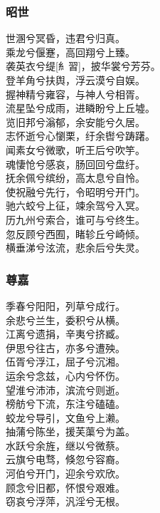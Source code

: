 \documentclass[]{article}
\begin{document}
\hypertarget{header-n287}{%
\subsubsection{昭世}\label{header-n287}}

世溷兮冥昏，违君兮归真。\\
乘龙兮偃蹇，高回翔兮上臻。\\
袭英衣兮缇{[}糹習{]}，披华裳兮芳芬。\\
登羊角兮扶舆，浮云漠兮自娱。\\
握神精兮雍容，与神人兮相胥。\\
流星坠兮成雨，进瞵盼兮上丘墟。\\
览旧邦兮滃郁，余安能兮久居。\\
志怀逝兮心懰栗，纡余辔兮踌躇。\\
闻素女兮微歌，听王后兮吹竽。\\
魂悽怆兮感哀，肠回回兮盘纡。\\
抚余佩兮缤纷，高太息兮自怜。\\
使祝融兮先行，令昭明兮开门。\\
驰六蛟兮上征，竦余驾兮入冥。\\
历九州兮索合，谁可与兮终生。\\
忽反顾兮西囿，睹轸丘兮崎倾。\\
横垂涕兮泫流，悲余后兮失灵。

\hypertarget{header-n292}{%
\subsubsection{尊嘉}\label{header-n292}}

季春兮阳阳，列草兮成行。\\
余悲兮兰生，委积兮从横。\\
江离兮遗捐，辛夷兮挤臧。\\
伊思兮往古，亦多兮遭殃。\\
伍胥兮浮江，屈子兮沉湘。\\
运余兮念兹，心内兮怀伤。\\
望淮兮沛沛，滨流兮则逝。\\
榜舫兮下流，东注兮磕磕。\\
蛟龙兮导引，文鱼兮上濑。\\
抽蒲兮陈坐，援芙蕖兮为盖。\\
水跃兮余旌，继以兮微蔡。\\
云旗兮电骛，倏忽兮容裔。\\
河伯兮开门，迎余兮欢欣。\\
顾念兮旧都，怀恨兮艰难。\\
窃哀兮浮萍，汎淫兮无根。
\end{document}
